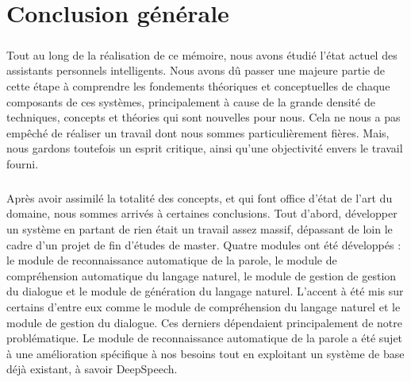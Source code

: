 \chapter*{Conclusion générale}


\paragraph{}
Tout au long de la réalisation de ce mémoire, nous avons étudié l'état actuel des assistants personnels intelligents. Nous avons dû passer une majeure partie de cette étape à comprendre les fondements théoriques et conceptuelles de chaque composants de ces systèmes, principalement à cause de la grande densité de techniques, concepts et théories qui sont nouvelles pour nous. Cela ne nous a pas empêché de réaliser un travail dont nous sommes particulièrement fières. Mais, nous gardons toutefois un esprit critique, ainsi qu'une objectivité envers le travail fourni. 

\paragraph{}
Après avoir assimilé la totalité des concepts, et qui font office d'état de l'art du domaine, nous sommes arrivés à certaines conclusions. Tout d'abord, développer un système en partant de rien était un travail assez massif, dépassant de loin le cadre d'un projet de fin d'études de master. Quatre modules ont été développés : le module de reconnaissance automatique de la parole, le module de compréhension automatique du langage naturel, le module de gestion de gestion du dialogue et le module de génération du langage naturel. L'accent à été mis sur certains d'entre eux comme le module de compréhension du langage naturel et le module de gestion du dialogue. Ces derniers dépendaient principalement de notre problématique. Le module de reconnaissance automatique de la parole a été sujet à une amélioration spécifique à nos besoins tout en exploitant un système de base déjà existant, à savoir DeepSpeech.


